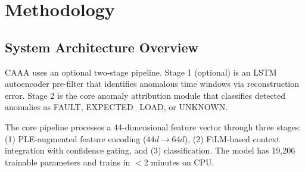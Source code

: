 \documentclass[12pt,a4paper]{report}
\newcommand{\sys}{CAAA}
\begin{document}
\chapter{Methodology}

\section{System Architecture Overview}

\sys{} uses an optional two-stage pipeline. Stage 1 (optional) is an LSTM autoencoder pre-filter that identifies anomalous time windows via reconstruction error. Stage 2 is the core anomaly attribution module that classifies detected anomalies as FAULT, EXPECTED\_LOAD, or UNKNOWN.

The core pipeline processes a 44-dimensional feature vector through three stages: (1) PLE-augmented feature encoding ($44d \rightarrow 64d$), (2) FiLM-based context integration with confidence gating, and (3) classification. The model has 19,206 trainable parameters and trains in $<$2 minutes on CPU.
\end{document}
